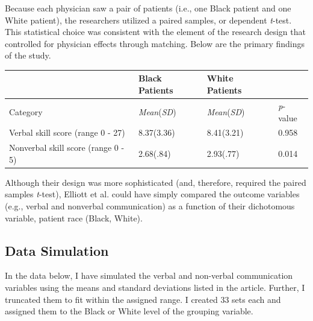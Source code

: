 \documentclass[
  11pt,
]{book}
\begin{document}
Because each physician saw a pair of patients (i.e., one Black patient and one White patient), the researchers utilized a paired samples, or dependent \emph{t}-test. This statistical choice was consistent with the element of the research design that controlled for physician effects through matching. Below are the primary findings of the study.

\begin{longtable}[]{@{}llll@{}}
\toprule\noalign{}
& Black Patients & White Patients & \\
\midrule\noalign{}
\endhead
\bottomrule\noalign{}
\endlastfoot
Category & \emph{Mean}(\emph{SD}) & \emph{Mean}(\emph{SD}) & \emph{p}-value \\
Verbal skill score (range 0 - 27) & 8.37(3.36) & 8.41(3.21) & 0.958 \\
Nonverbal skill score (range 0 - 5) & 2.68(.84) & 2.93(.77) & 0.014 \\
\end{longtable}

Although their design was more sophisticated (and, therefore, required the paired samples \emph{t}-test), Elliott et al. \citeyearpar{elliott_differences_2016} could have simply compared the outcome variables (e.g., verbal and nonverbal communication) as a function of their dichotomous variable, patient race (Black, White).

\hypertarget{data-simulation-1}{%
\subsection{Data Simulation}\label{data-simulation-1}}

In the data below, I have simulated the verbal and non-verbal communication variables using the means and standard deviations listed in the article. Further, I truncated them to fit within the assigned range. I created 33 sets each and assigned them to the Black or White level of the grouping variable.
\end{document}
